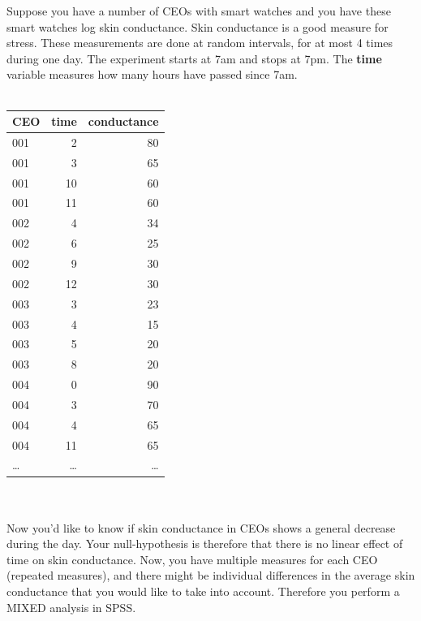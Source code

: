 \documentclass[]{report}\usepackage[]{graphicx}\usepackage[]{color}
\begin{document}
Suppose you have a number of CEOs with smart watches and you have these smart watches log skin conductance. Skin conductance is a good measure for stress. These measurements are done at random intervals, for at most 4 times during one day. The experiment starts at 7am and stops at 7pm. The \textbf{time} variable measures how many hours have passed since 7am.
 \\
 \\
 \begin{tabular}{lrr}
 CEO & time & conductance \\ \hline
 001 & 2 & 80 \\
 001 & 3 & 65 \\
 001 & 10 & 60 \\
 001 & 11 & 60 \\
 002 & 4 & 34 \\
 002 & 6 & 25 \\
 002 & 9 & 30 \\
 002 & 12 & 30 \\
 003 & 3 & 23 \\
 003 & 4 & 15 \\
 003 & 5 & 20 \\
 003 & 8 & 20 \\
 004 & 0 & 90 \\
 004 & 3 & 70 \\
 004 & 4 & 65 \\
 004 & 11 & 65 \\
 \dots & \dots & \dots \\
 \end{tabular}
\\
\\
Now you'd like to know if skin conductance in CEOs shows a general decrease during the day. Your null-hypothesis is therefore that there is no linear effect of time on skin conductance. Now, you have multiple measures for each CEO (repeated measures), and there might be individual differences in the average skin conductance that you would like to take into account. Therefore you perform a MIXED analysis in SPSS. 
\end{document}
